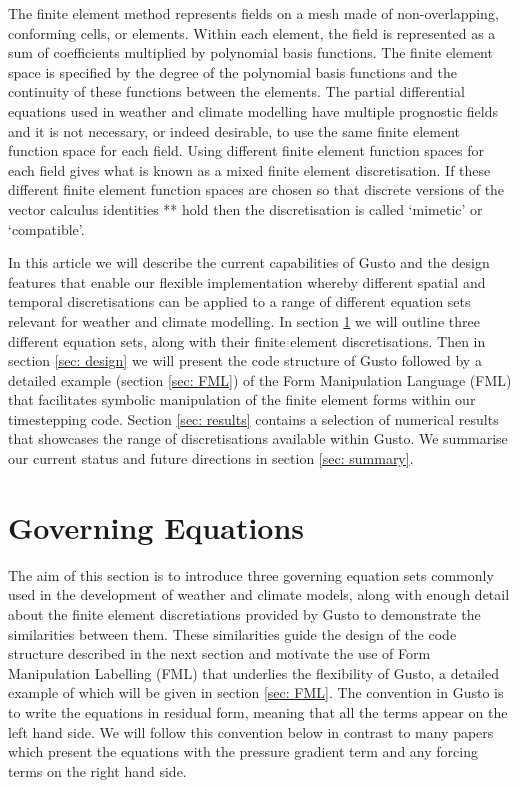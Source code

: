 \documentclass[journal abbreviation, manuscript]{copernicus}
\begin{document}
The finite element method represents fields on a mesh made of
non-overlapping, conforming cells, or elements. Within each element,
the field is represented as a sum of coefficients multiplied by
polynomial basis functions. The finite element space is specified by
the degree of the polynomial basis functions and the continuity of
these functions between the elements. The partial differential
equations used in weather and climate modelling have multiple
prognostic fields and it is not necessary, or indeed desirable, to use
the same finite element function space for each field. Using different
finite element function spaces for each field gives what is known as a
mixed finite element discretisation. If these different finite element
function spaces are chosen so that discrete versions of the vector
calculus identities ** hold then the discretisation is called
`mimetic' or `compatible'.

In this article we will describe the current capabilities of Gusto and
the design features that enable our flexible implementation whereby
different spatial and temporal discretisations can be applied to a
range of different equation sets relevant for weather and climate
modelling. In section \ref{sec: governing} we will outline three
different equation sets, along with their finite element
discretisations. Then in section \ref{sec: design} we will present the
code structure of Gusto followed by a detailed example (section
\ref{sec: FML}) of the Form Manipulation Language (FML) that facilitates
symbolic manipulation of the finite element forms within our
timestepping code. Section \ref{sec: results} contains a selection of
numerical results that showcases the range of discretisations
available within Gusto. We summarise our current status and future
directions in section \ref{sec: summary}.

\section{Governing Equations}
\label{sec: governing}
The aim of this section is to introduce three governing equation sets
commonly used in the development of weather and climate models, along
with enough detail about the finite element discretiations provided by
Gusto to demonstrate the similarities between them. These similarities
guide the design of the code structure described in the next section
and motivate the use of Form Manipulation Labelling (FML) that
underlies the flexibility of Gusto, a detailed example of which will
be given in section \ref{sec: FML}. The convention in Gusto is to
write the equations in residual form, meaning that all the terms
appear on the left hand side. We will follow this convention below in
contrast to many papers which present the equations with the pressure
gradient term and any forcing terms on the right hand side.
\end{document}
